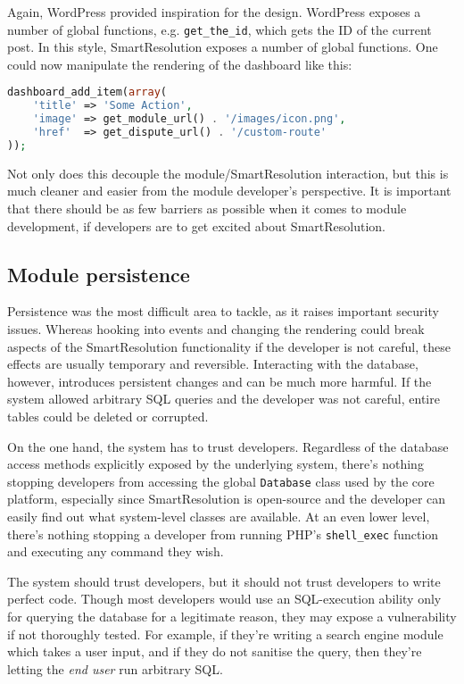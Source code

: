 Again, WordPress provided inspiration for the design. WordPress exposes a number of global functions, e.g. \lstinline{get_the_id}, which gets the ID of the current post. In this style, SmartResolution exposes a number of global functions. One could now manipulate the rendering of the dashboard like this:

\begin{lstlisting}[language=php]
dashboard_add_item(array(
    'title' => 'Some Action',
    'image' => get_module_url() . '/images/icon.png',
    'href'  => get_dispute_url() . '/custom-route'
));
\end{lstlisting}

Not only does this decouple the module/SmartResolution interaction, but this is much cleaner and easier from the module developer's perspective. It is important that there should be as few barriers as possible when it comes to module development, if developers are to get excited about SmartResolution.

\subsection{Module persistence}

Persistence was the most difficult area to tackle, as it raises important security issues. Whereas hooking into events and changing the rendering could break aspects of the SmartResolution functionality if the developer is not careful, these effects are usually temporary and reversible. Interacting with the database, however, introduces persistent changes and can be much more harmful. If the system allowed arbitrary SQL queries and the developer was not careful, entire tables could be deleted or corrupted.

On the one hand, the system has to trust developers. Regardless of the database access methods explicitly exposed by the underlying system, there's nothing stopping developers from accessing the global \lstinline{Database} class used by the core platform, especially since SmartResolution is open-source and the developer can easily find out what system-level classes are available. At an even lower level, there's nothing stopping a developer from running PHP's \lstinline{shell_exec} function and executing any command they wish.

The system should trust developers, but it should not trust developers to write perfect code. Though most developers would use an SQL-execution ability only for querying the database for a legitimate reason, they may expose a vulnerability if not thoroughly tested. For example, if they're writing a search engine module which takes a user input, and if they do not sanitise the query, then they're letting the \emph{end user} run arbitrary SQL.

